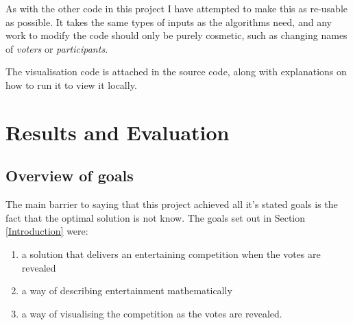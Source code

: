 \documentclass[12pt]{report}
\begin{document}
As with the other code in this project I have attempted to make this as re-usable as possible. It takes the same types of inputs as the algorithms need, and any work to modify the code should only be purely cosmetic, such as changing names of \textit{voters} or \textit{participants}.

The visualisation code is attached in the source code, along with explanations on how to run it to view it locally.

\section{Results and Evaluation}\label{Results}
\subsection{Overview of goals}
The main barrier to saying that this project achieved all it's stated goals is the fact that the optimal solution is not know. The goals set out in Section \ref{Introduction} were:
\begin{enumerate}
\item a solution that delivers an entertaining competition when the votes are revealed
\item a way of describing entertainment mathematically
\item a way of visualising the competition as the votes are revealed.
\end{enumerate}
\end{document}
